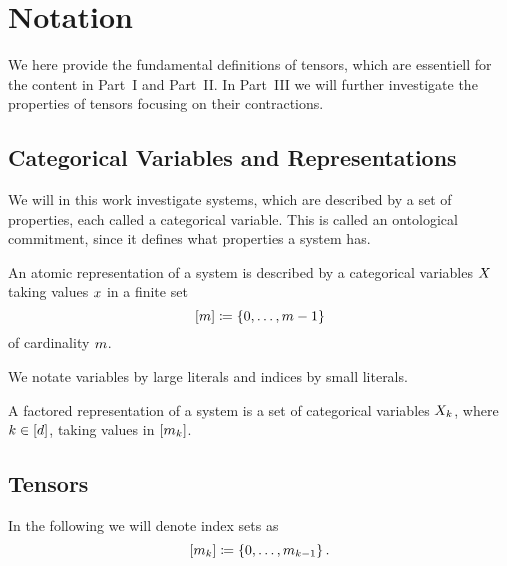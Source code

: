 \section{Notation}\label{cha:TensorNetworks}

We here provide the fundamental definitions of tensors, which are essentiell for the content in Part~I and Part~II.
In Part~III we will further investigate the properties of tensors focusing on their contractions.

\subsection{Categorical Variables and Representations}

We will in this work investigate systems, which are described by a set of properties, each called a categorical variable. 
This is called an ontological commitment, since it defines what properties a system has.

\begin{definition}
	An atomic representation of a system is described by a categorical variables $X$ taking values $x$ in a finite set 
		\[  [m]\coloneqq \{0,\ldots, m-1\} \]
	of cardinality $m$.
\end{definition}

We notate variables by large literals and indices by small literals.



\begin{definition}
	A factored representation of a system is a set of categorical variables $X_{k}$, where $k\in[d]$, taking values in $[m_{k}]$.
\end{definition}

\subsection{Tensors}


In the following we will denote index sets as
	\[ [m_{k}] \coloneqq \{0,\ldots,m_{k-1} \} \, . \]

